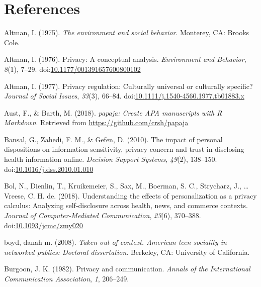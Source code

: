 \documentclass[man,floatsintext]{apa6}
\begin{document}
\newpage

\hypertarget{references}{%
\section{References}\label{references}}

\begingroup
\setlength{\parindent}{-0.5in}
\setlength{\leftskip}{0.5in}

\hypertarget{refs}{}
\leavevmode\hypertarget{ref-Altman.1975}{}%
Altman, I. (1975). \emph{The environment and social behavior}. Monterey, CA: Brooks Cole.

\leavevmode\hypertarget{ref-Altman.1976}{}%
Altman, I. (1976). Privacy: A conceptual analysis. \emph{Environment and Behavior}, \emph{8}(1), 7--29. doi:\href{https://doi.org/10.1177/001391657600800102}{10.1177/001391657600800102}

\leavevmode\hypertarget{ref-Altman.1977}{}%
Altman, I. (1977). Privacy regulation: Culturally universal or culturally specific? \emph{Journal of Social Issues}, \emph{33}(3), 66--84. doi:\href{https://doi.org/10.1111/j.1540-4560.1977.tb01883.x}{10.1111/j.1540-4560.1977.tb01883.x}

\leavevmode\hypertarget{ref-R-papaja}{}%
Aust, F., \& Barth, M. (2018). \emph{papaja: Create APA manuscripts with R Markdown}. Retrieved from \url{https://github.com/crsh/papaja}

\leavevmode\hypertarget{ref-Bansal.2010}{}%
Bansal, G., Zahedi, F. M., \& Gefen, D. (2010). The impact of personal dispositions on information sensitivity, privacy concern and trust in disclosing health information online. \emph{Decision Support Systems}, \emph{49}(2), 138--150. doi:\href{https://doi.org/10.1016/j.dss.2010.01.010}{10.1016/j.dss.2010.01.010}

\leavevmode\hypertarget{ref-Bol.2018}{}%
Bol, N., Dienlin, T., Kruikemeier, S., Sax, M., Boerman, S. C., Strycharz, J., \ldots{} Vreese, C. H. de. (2018). Understanding the effects of personalization as a privacy calculus: Analyzing self-disclosure across health, news, and commerce contexts. \emph{Journal of Computer-Mediated Communication}, \emph{23}(6), 370--388. doi:\href{https://doi.org/10.1093/jcmc/zmy020}{10.1093/jcmc/zmy020}

\leavevmode\hypertarget{ref-boyd.2008c}{}%
boyd, danah m. (2008). \emph{Taken out of context. American teen sociality in networked publics: Doctoral dissertation}. Berkeley, CA: University of California.

\leavevmode\hypertarget{ref-Burgoon.1982}{}%
Burgoon, J. K. (1982). Privacy and communication. \emph{Annals of the International Communication Association}, \emph{1}, 206--249.
\end{document}
